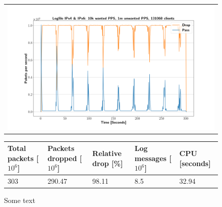 \begin{figure}[p]
	\label{fig:simplefail2ban:disk:ip46:1m}
	\centering
	\scriptsize
	\begin{tabular}{c}
    	\centerline{\includegraphics[width=1.2\textwidth]{images/simplefail2ban_disk_ipv46_v10k_iv1m_c131068.png}}
	\end{tabular}
	\begin{tabular}{lllll}
		\toprule
		\textbf{Total packets [$10^6$]} & \textbf{Packets dropped [$10^6$]} & \textbf{Relative drop [\%]} & \textbf{Log messages [$10^6$]} & \textbf{CPU [seconds]} \\ \midrule 
		303 & 290.47 & 98.11 & 8.5 & 32.94 \\
	\bottomrule
	\end{tabular}
	\caption[Simplefail2ban, Logfile IPv4 \& IPv6, 1m \ac{PPS}]{Some text}
\end{figure}


